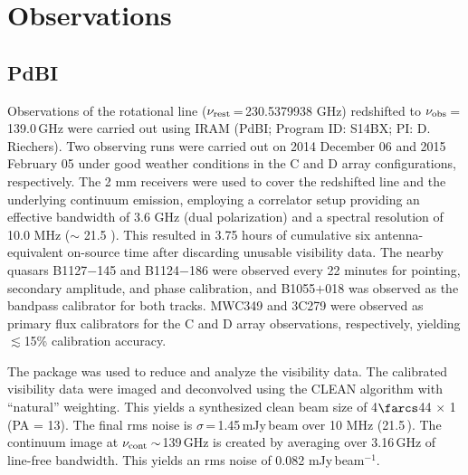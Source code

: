 \documentclass[]{emulateapj}
\begin{document}
\section{Observations} \label{sec:obs}
\subsection{PdBI \bco}
Observations of the \bco rotational line
($\nu_{\rm rest}$\,=\,230.5379938 GHz) redshifted to $\nu_{\rm obs}$\,=\,139.0\,GHz
were carried out using IRAM \pdbi (PdBI; Program ID: S14BX; PI: D.
Riechers). Two observing runs were carried out on 2014 December 06 and 2015
February 05 under good weather conditions in the C and D array configurations,
respectively. The 2 mm receivers were used to cover the redshifted \bco line
and the underlying continuum emission, employing a correlator setup providing
an effective bandwidth of 3.6 GHz (dual polarization) and a spectral resolution of 10.0 MHz ($\sim$
21.5 \kms). This resulted in 3.75 hours of cumulative six antenna-equivalent on-source
 time after discarding unusable visibility data.
The nearby quasars B1127$-$145 and B1124$-$186 were observed every 22 minutes
for pointing, secondary amplitude, and phase calibration, and B1055$+$018 was
observed as the bandpass calibrator for both tracks.
MWC349 and 3C279 were observed as primary flux calibrators for the C and D
array observations, respectively, yielding $\lesssim$15\% calibration accuracy.

The  package was used to reduce and analyze the visibility data.
The calibrated visibility data were imaged and deconvolved using the CLEAN algorithm with ``natural''
weighting. This yields a synthesized clean beam size of 4$\farcs$44 $\times$ 1 (PA = 13\degr).
The final rms noise is $\sigma$\,=\,1.45\,mJy\,beam\pmOne
over 10 MHz (21.5\,\kms). The continuum image at $\nu_{\rm cont}\sim$139\,GHz
is created by averaging over 3.16\,GHz of line-free bandwidth. This
yields an rms noise of 0.082 mJy\,beam$^{-1}$. %
\end{document}
